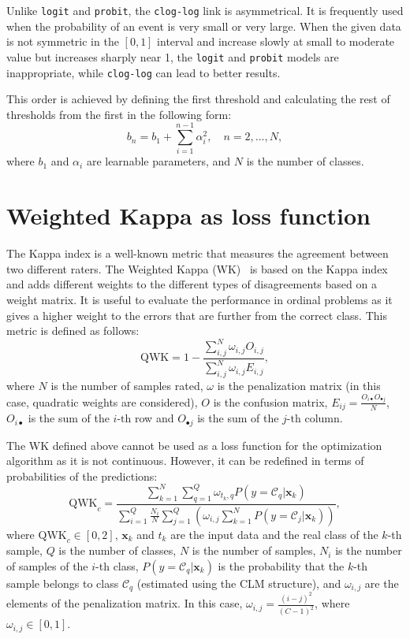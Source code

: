 \documentclass[journal]{IEEEtran}
\begin{document}
	Unlike \texttt{logit} and \texttt{probit}, the \texttt{clog-log} link is asymmetrical. It is frequently used when the probability of an event is very small or very large. When the given data is not symmetric in the $[0,1]$ interval and increase slowly at small to moderate value but increases sharply near 1, the \texttt{logit} and \texttt{probit} models are inappropriate, while \texttt{clog-log} can lead to better results.
	
	This order is achieved by defining the first threshold and calculating the rest of thresholds from the first in the following form:	
	\begin{equation}
	\nonumber
	b_n = b_1 + \sum_{i=1}^{n-1} \alpha_i^2, \quad n = 2, ..., N,
	\end{equation}
	where $b_1$ and $\alpha_i$ are learnable parameters, and $N$ is the number of classes.
	
	\section{Weighted Kappa as loss function}
	\label{sect:wk}
	The Kappa index is a well-known metric that measures the agreement between two different raters. The Weighted Kappa (WK)~\cite{ben2008comparison} is based on the Kappa index and adds different weights to the different types of disagreements based on a weight matrix. It is useful to evaluate the performance in ordinal problems as it gives a higher weight to the errors that are further from the correct class. This metric is defined as follows:
	\begin{equation}
	\nonumber
	\text{QWK} = 1 - \frac{\sum\limits^N_{i,j} \omega_{i,j} O_{i,j}}{\sum\limits^N_{i,j} \omega_{i,j} E_{i,j}},
	\end{equation}
	where $N$ is the number of samples rated, $\omega$ is the penalization matrix (in this case, quadratic weights are considered), $O$ is the confusion matrix, $E_{ij} = \frac{O_{i\bullet} O_{\bullet j}}{N}$, $O_{i\bullet}$ is the sum of the $i\text{-th}$ row and $O_{\bullet j}$ is the sum of the $j\text{-th}$ column.
	
	The WK defined above cannot be used as a loss function for the optimization algorithm as it is not continuous. However, it can be redefined in terms of probabilities of the predictions:
	\begin{equation}
	\nonumber
	\text{QWK}_c = \frac{\sum\limits_{k=1}^N \sum\limits_{q=1}^Q \omega_{t_k, q} P(y = \mathcal{C}_q | \mathbf{x}_k)}{\sum\limits_{i=1}^Q \frac{N_i}{N} \sum\limits_{j=1}^Q ( \omega_{i,j} \sum\limits_{k=1}^N P(y = \mathcal{C}_j | \mathbf{x}_k))},
	\end{equation}
	where $\text{QWK}_c \in [0,2]$, $\mathbf{x}_k$ and $t_k$ are the input data and the real class of the $k$-th sample, $Q$ is the number of classes, $N$ is the number of samples, $N_i$ is the number of samples of the $i$-th class, $P(y = \mathcal{C}_q | \mathbf{x}_k)$ is the probability that the $k$-th sample belongs to class $\mathcal{C}_q$ (estimated using the CLM structure), and $\omega_{i,j}$ are the elements of the penalization matrix. In this case, $\omega_{i,j} = \frac{(i-j)^2}{(C-1)^2}$, where $\omega_{i,j} \in [0,1]$.
	
\end{document}
